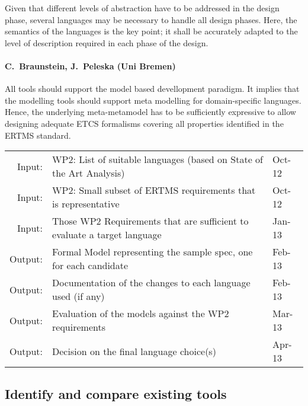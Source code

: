 \documentclass[11pt, a4paper]{article}
\let\oldmarginpar\marginpar
\renewcommand\marginpar[1]{\-\oldmarginpar[\raggedleft\scriptsize #1]%
{\raggedright\scriptsize #1}}
\newenvironment{inoutput}
{\vspace{2mm}
\noindent
\begin{tabular}{|r|p{.7\linewidth}|l|}
\hline}
{
\hline
\end{tabular}}
\begin{document}

Given that different levels of abstraction have to be addressed in the
design phase, several languages may be necessary to handle all design
phases. Here, the semantics of the languages is the key point; it
shall be accurately adapted to the level of description required in
each phase of the design.

\paragraph{C.~Braunstein, J.~Peleska (Uni Bremen)}
All tools should support the model based devellopment paradigm.
It implies that the modelling tools should support meta modelling for domain-specific languages.
Hence, the underlying meta-metamodel has to be sufficiently expressive to allow 
designing adequate ETCS formalisms covering all properties identified in the
ERTMS standard.\\

\begin{inoutput}
Input: & WP2: List of suitable languages (based on State of the Art Analysis) & Oct-12 \\
Input: & WP2: Small subset of ERTMS requirements that is representative & Oct-12 \\
Input: & Those WP2 Requirements that are sufficient to evaluate a target language & Jan-13 \\
\hline
Output: & Formal Model representing the sample spec, one for each candidate & Feb-13 \\
Output: & Documentation of the changes to each language used (if any) & Feb-13 \\
Output: & Evaluation of the models against the WP2 requirements & Mar-13 \\
Output: & Decision on the final language choice(s) & Apr-13 \\
\end{inoutput}

\subsection{Identify and compare existing tools}
\label{sec:tool}
\end{document}
